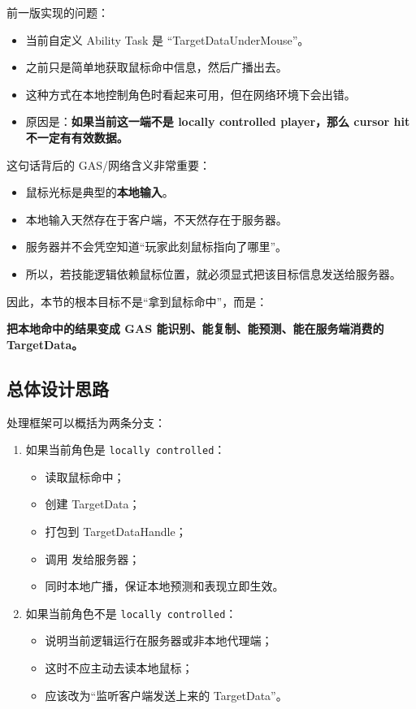 \documentclass[10pt,CJKmath]{ctexart}
\begin{document}
前一版实现的问题：
\begin{itemize}
	\item 当前自定义 Ability Task 是 ``TargetDataUnderMouse''。
	\item 之前只是简单地获取鼠标命中信息，然后广播出去。
	\item 这种方式在本地控制角色时看起来可用，但在网络环境下会出错。
	\item 原因是：\textbf{如果当前这一端不是 locally controlled player，那么 cursor hit 不一定有有效数据。}
\end{itemize}

这句话背后的 GAS/网络含义非常重要：

\begin{itemize}
	\item 鼠标光标是典型的\textbf{本地输入}。
	\item 本地输入天然存在于客户端，不天然存在于服务器。
	\item 服务器并不会凭空知道“玩家此刻鼠标指向了哪里”。
	\item 所以，若技能逻辑依赖鼠标位置，就必须显式把该目标信息发送给服务器。
\end{itemize}

因此，本节的根本目标不是“拿到鼠标命中”，而是：

\begin{center}
	\textbf{把本地命中的结果变成 GAS 能识别、能复制、能预测、能在服务端消费的 TargetData。}
\end{center}

\subsection{总体设计思路}

处理框架可以概括为两条分支：
\begin{enumerate}
	\item 如果当前角色是 \texttt{locally controlled}：
	\begin{itemize}
		\item 读取鼠标命中；
		\item 创建 TargetData；
		\item 打包到 TargetDataHandle；
		\item 调用  发给服务器；
		\item 同时本地广播，保证本地预测和表现立即生效。
	\end{itemize}
	
	\item 如果当前角色不是 \texttt{locally controlled}：
	\begin{itemize}
		\item 说明当前逻辑运行在服务器或非本地代理端；
		\item 这时不应主动去读本地鼠标；
		\item 应该改为“监听客户端发送上来的 TargetData”。
	\end{itemize}
\end{enumerate}
\end{document}
